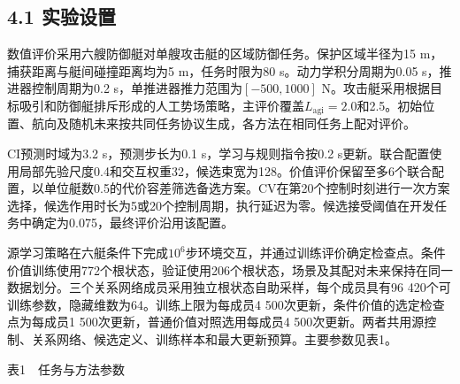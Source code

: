 \documentclass[UTF8,10.5pt,a4paper,fontset=none]{ctexart}
\begin{document}
\subsection{4.1 实验设置}\label{ux5b9eux9a8cux8bbeux7f6e}

数值评价采用六艘防御艇对单艘攻击艇的区域防御任务。保护区域半径为15
m，捕获距离与艇间碰撞距离均为5 m，任务时限为80 s。动力学积分周期为0.05
s，推进器控制周期为0.2 s，单推进器推力范围为\([-500,1000]\)
N。攻击艇采用根据目标吸引和防御艇排斥形成的人工势场策略，主评价覆盖\(L_{\mathrm{agi}}=2.0\)和2.5。初始位置、航向及随机未来按共同任务协议生成，各方法在相同任务上配对评价。

CI预测时域为3.2 s，预测步长为0.1 s，学习与规则指令按0.2
s更新。联合配置使用局部先验尺度0.4和交互权重32，候选束宽为128。价值评价保留至多6个联合配置，以单位艇数0.5的代价容差筛选备选方案。CV在第20个控制时刻进行一次方案选择，候选作用时长为5或20个控制周期，执行延迟为零。候选接受阈值在开发任务中确定为0.075，最终评价沿用该配置。

源学习策略在六艇条件下完成\(10^6\)步环境交互，并通过训练评价确定检查点。条件价值训练使用772个根状态，验证使用206个根状态，场景及其配对未来保持在同一数据划分。三个关系网络成员采用独立根状态自助采样，每个成员具有96
420个可训练参数，隐藏维数为64。训练上限为每成员4
500次更新，条件价值的选定检查点为每成员1
500次更新，普通价值对照选用每成员4
500次更新。两者共用源控制、关系网络、候选定义、训练样本和最大更新预算。主要参数见表1。

\begin{center}\small 表1　任务与方法参数\end{center}
\end{document}
